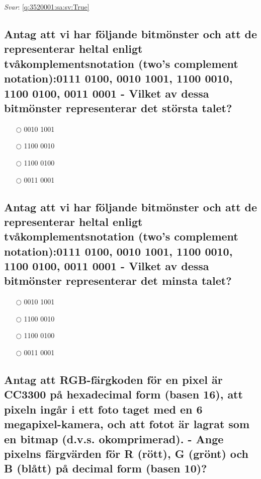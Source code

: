 \documentclass[a4paper,11pt,oneside]{article}
\begin{document}
\begin{sloppypar}
\textit{Svar}: \autoref{q:3520001:sa:sv:True}



\subsection{Antag att vi har f\"oljande bitm\"onster och att de representerar heltal enligt tv\r{a}komplementsnotation (two{\textquoteright}s complement notation):0111 0100, 0010 1001, 1100 0010, 1100 0100, 0011 0001 - Vilket av dessa bitm\"onster representerar det st\"orsta talet?}

\label{q:35300:mc:sv:True}

\begin{itemize}
  \item[$\bigcirc$] 0010 1001
  \item[$\bigcirc$] 1100 0010
  \item[$\bigcirc$] 1100 0100
  \item[$\bigcirc$] 0011 0001
\end{itemize}

\subsection{Antag att vi har f\"oljande bitm\"onster och att de representerar heltal enligt tv\r{a}komplementsnotation (two{\textquoteright}s complement notation):0111 0100, 0010 1001, 1100 0010, 1100 0100, 0011 0001 - Vilket av dessa bitm\"onster representerar det minsta talet?}

\label{q:3530001:mc:sv:True}

\begin{itemize}
  \item[$\bigcirc$] 0010 1001
  \item[$\bigcirc$] 1100 0010
  \item[$\bigcirc$] 1100 0100
  \item[$\bigcirc$] 0011 0001
\end{itemize}



\subsection{Antag att RGB-f\"argkoden f\"or en pixel \"ar CC3300 p\r{a} hexadecimal form (basen 16), att pixeln ing\r{a}r i ett foto taget med en 6 megapixel-kamera, och att fotot \"ar lagrat som en bitmap (d.v.s. okomprimerad). - Ange pixelns f\"argv\"arden f\"or R (r\"ott), G (gr\"ont) och B (bl\r{a}tt) p\r{a} decimal form (basen 10)?}


\end{sloppypar}
\end{document}
